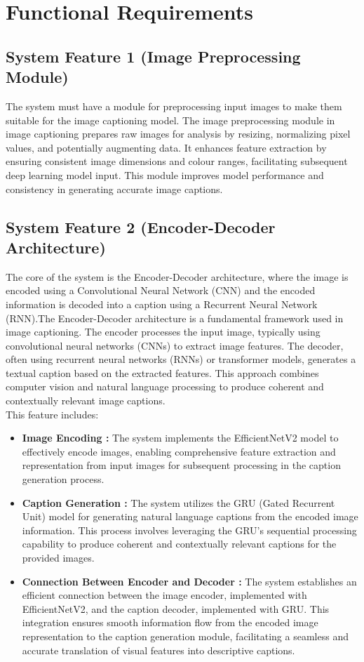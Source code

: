 \documentclass[oneside,a4paper,12pt]{report}
\begin{document}
\section{Functional Requirements}
  
 \subsection{System Feature 1 (Image Preprocessing Module)}  
The system must have a module for preprocessing input images to make them suitable for the image captioning model. The image preprocessing module in image captioning prepares raw images for analysis by resizing, normalizing pixel values, and potentially augmenting data. It enhances feature extraction by ensuring consistent image dimensions and colour ranges, facilitating subsequent deep learning model input. This module improves model performance and consistency in generating accurate image captions.


\subsection{System Feature 2 (Encoder-Decoder Architecture)}
The core of the system is the Encoder-Decoder architecture, where the image is encoded using a Convolutional Neural Network (CNN) and the encoded information is decoded into a caption using a Recurrent Neural Network (RNN).The Encoder-Decoder architecture is a fundamental framework used in image captioning. The encoder processes the input image, typically using convolutional neural networks (CNNs) to extract image features. The decoder, often using recurrent neural networks (RNNs) or transformer models, generates a textual caption based on the extracted features. This approach combines computer vision and natural language processing to produce coherent and contextually relevant image captions. \\ 
This feature includes:
\begin{itemize}
\item \textbf{Image Encoding :} The system implements the EfficientNetV2 model to effectively encode images, enabling comprehensive feature extraction and representation from input images for subsequent processing in the caption generation process.
\item \textbf{Caption Generation : } The system utilizes the GRU (Gated Recurrent Unit) model for generating natural language captions from the encoded image information. This process involves leveraging the GRU's sequential processing capability to produce coherent and contextually relevant captions for the provided images.
\item \textbf{Connection Between Encoder and Decoder : }The system establishes an efficient connection between the image encoder, implemented with EfficientNetV2, and the caption decoder, implemented with GRU. This integration ensures smooth information flow from the encoded image representation to the caption generation module, facilitating a seamless and accurate translation of visual features into descriptive captions.
\end{itemize}
\end{document}
